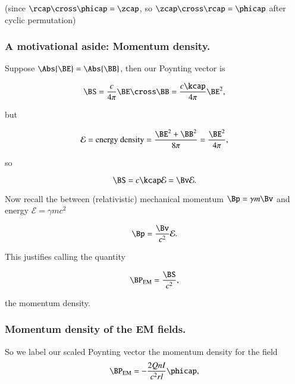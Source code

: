 (since $\rcap \cross \phicap = \zcap$, so $\zcap \cross \rcap = \phicap$ after cyclic permutation)

\subsubsection{A motivational aside:  Momentum density.}

Suppose $\Abs{\BE} = \Abs{\BB}$, then our Poynting vector is

\begin{equation}\label{eqn:relativisticElectrodynamicsT5:170}
\BS = \frac{c}{4 \pi} \BE \cross \BB = \frac{ c \kcap}{4 \pi} \BE^2,
\end{equation}

but

\begin{equation}\label{eqn:relativisticElectrodynamicsT5:190}
\mathcal{E} = \text{energy density} = \frac{\BE^2 + \BB^2}{8 \pi} = \frac{\BE^2}{4 \pi},
\end{equation}

so

\begin{equation}\label{eqn:relativisticElectrodynamicsT5:210}
\BS = c \kcap \mathcal{E} = \Bv \mathcal{E}.
\end{equation}

Now recall the between (relativistic) mechanical momentum $\Bp = \gamma m \Bv$ and energy $\mathcal{E} = \gamma m c^2$

\begin{equation}\label{eqn:relativisticElectrodynamicsT5:230}
\Bp = \frac{\Bv}{c^2} \mathcal{E}.
\end{equation}

This justifies calling the quantity

\begin{equation}\label{eqn:relativisticElectrodynamicsT5:250}
\BP_{\text{EM}} = \frac{\BS}{c^2},
\end{equation}

the momentum density.

\subsubsection{Momentum density of the EM fields.}

So we label our scaled Poynting vector the momentum density for the field
\begin{equation}\label{eqn:relativisticElectrodynamicsT5:270}
\BP_{\text{EM}} = -\frac{2 Q n I}{c^2 r l} \phicap,
\end{equation}

